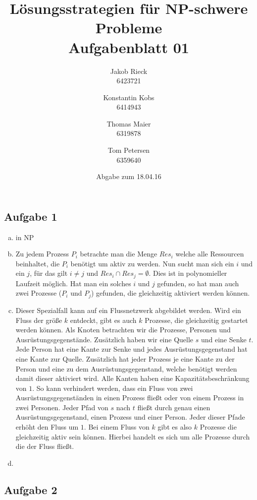 \documentclass[12pt,a4paper]{article}
\title{Lösungsstrategien für NP-schwere Probleme\\Aufgabenblatt 01}
\author{
		Jakob Rieck\\
		\small{6423721}
	\and
		Konstantin Kobs\\
		\small{6414943}
	\and
		Thomas Maier\\
		\small{6319878}
	\and
		Tom Petersen\\
		\small{6359640}
}
\date{Abgabe zum 18.04.16}
\begin{document}
\maketitle

\subsection*{Aufgabe 1}

 \begin{enumerate}[a)]
 	\item in NP
 	\item Zu jedem Prozess $P_i$ betrachte man die Menge $Res_i$ welche alle Ressourcen beinhaltet, die $P_i$ benötigt um aktiv zu werden. Nun sucht man sich ein $i$ und ein $j$, für das gilt $i \neq j$ und $Res_i \cap Res_j =\emptyset$. Dies ist in polynomieller Laufzeit möglich. Hat man ein solches $i$ und $j$ gefunden, so hat man auch zwei Prozesse ($P_i$ und $P_j$) gefunden, die gleichzeitig aktiviert werden können. 
 	
 	\item Dieser Spezialfall kann auf ein Flussnetzwerk abgebildet werden. Wird ein Fluss der größe $k$ entdeckt, gibt es auch $k$ Prozesse, die gleichzeitig gestartet werden können. Als Knoten betrachten wir die Prozesse, Personen und Ausrüstungsgegenstände. Zusätzlich haben wir eine Quelle $s$ und eine Senke $t$. Jede Person hat eine Kante zur Senke und jedes Ausrüstungsgegenstand hat eine Kante zur Quelle. Zusätzlich hat jeder Prozess je eine Kante zu der Person und eine zu dem Ausrüstungsgegenstand, welche benötigt werden damit dieser aktiviert wird. Alle Kanten haben eine Kapazitätsbeschränkung von $1$. So kann verhindert werden, dass ein Fluss von zwei Ausrüstungsgegenständen in einen Prozess fließt oder von einem Prozess in zwei Personen. Jeder Pfad von $s$ nach $t$ fließt durch genau einen Ausrüstungsgegenstand, einen Prozess und einer Person. Jeder dieser Pfade erhöht den Fluss um $1$. Bei einem Fluss von $k$ gibt es also $k$ Prozesse die gleichzeitig aktiv sein können. Hierbei handelt es sich um alle Prozesse durch die der Fluss fließt.  
 	\item %
\end{enumerate}
\subsection*{Aufgabe 2}
\end{document}

